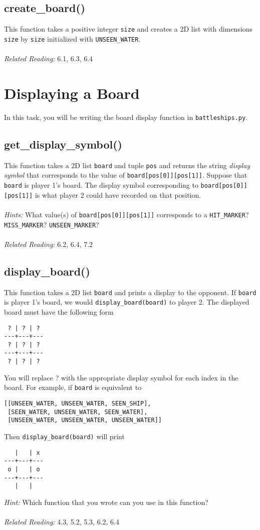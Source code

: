 \documentclass{article}
\begin{document}
\subsection{create\_board()}
This function takes a positive integer \texttt{size} and creates a 2D list with dimensions \texttt{size} by \texttt{size} initialized with \texttt{UNSEEN\_WATER}.\\\\
\textit{Related Reading:} 6.1, 6.3, 6.4

\section{Displaying a Board}
In this task, you will be writing the board display function in \texttt{battleships.py}.

\subsection{get\_display\_symbol()}
This function takes a 2D list \texttt{board} and tuple \texttt{pos} and returns the string \textit{display symbol} that corresponds to the value of \texttt{board[pos[0]][pos[1]]}. Suppose that \texttt{board} is player 1's board. The display symbol corresponding to \texttt{board[pos[0]][pos[1]]} is what player 2 could have recorded on that position.\\\\
\textit{Hints:} What value(s) of \texttt{board[pos[0]][pos[1]]} corresponds to a \texttt{HIT\_MARKER}? \texttt{MISS\_MARKER}? \texttt{UNSEEN\_MARKER}?\\\\
\textit{Related Reading:} 6.2, 6.4, 7.2

\subsection{display\_board()}
This function takes a 2D list \texttt{board} and prints a display to the opponent. If \texttt{board} is player 1's board, we would \texttt{display\_board(board)} to player 2. The displayed board must have the following form
\begin{verbatim}
 ? | ? | ?  
---+---+---
 ? | ? | ?
---+---+---
 ? | ? | ?
\end{verbatim}
You will replace ? with the appropriate display symbol for each index in the board. For example, if \texttt{board} is equivalent to
\begin{verbatim}
[[UNSEEN_WATER, UNSEEN_WATER, SEEN_SHIP], 
 [SEEN_WATER, UNSEEN_WATER, SEEN_WATER], 
 [UNSEEN_WATER, UNSEEN_WATER, UNSEEN_WATER]]
\end{verbatim}
Then \texttt{display\_board(board)} will print
\begin{verbatim}
   |   | x  
---+---+---
 o |   | o
---+---+---
   |   | 
\end{verbatim}
\textit{Hint:} Which function that you wrote can you use in this function?\\\\
\textit{Related Reading:} 4.3, 5.2, 5.3, 6.2, 6.4
\end{document}
